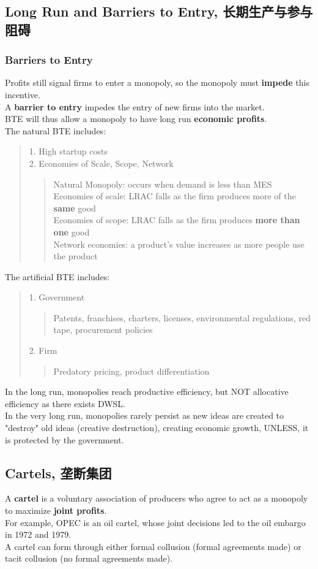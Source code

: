 \subsection{Long Run and Barriers to Entry, 长期生产与参与阻碍}
\subsubsection{Barriers to Entry}
Profits still signal firms to enter a monopoly, so the monopoly must \textbf{impede} this incentive. \\
A \textbf{barrier to entry} impedes the entry of new firms into the market. \\
BTE will thus allow a monopoly to have long run \textbf{economic profits}. \\
The natural BTE includes:
\begin{quote}
    1. High startup costs \\
    2. Economies of Scale, Scope, Network
    \begin{quote}
        Natural Monopoly: occurs when demand is less than MES \\
        Economies of scale: LRAC falls as the firm produces more of the \textbf{same} good \\
        Economies of scope: LRAC falls as the firm produces \textbf{more than one} good \\
        Network economies: a product's value increases as more people use the product
    \end{quote}
\end{quote}
The artificial BTE includes:
\begin{quote}
    1. Government
    \begin{quote}
        Patents, franchises, charters, licenses, environmental regulations, red tape, procurement policies
    \end{quote}
    2. Firm
    \begin{quote}
        Predatory pricing, product differentiation
    \end{quote}
\end{quote}
In the long run, monopolies reach productive efficiency, but NOT allocative efficiency as there exists DWSL. \\
In the very long run, monopolies rarely persist as new ideas are created to "destroy" old ideas (creative destruction), creating economic growth, UNLESS, it is protected by the government.

\subsection{Cartels, 垄断集团}
A \textbf{cartel} is a voluntary association of producers who agree to act as a monopoly to maximize \textbf{joint profits}. \\
For example, OPEC is an oil cartel, whose joint decisions led to the oil embargo in 1972 and 1979. \\
A cartel can form through either formal collusion (formal agreements made) or tacit collusion (no formal agreements made).

